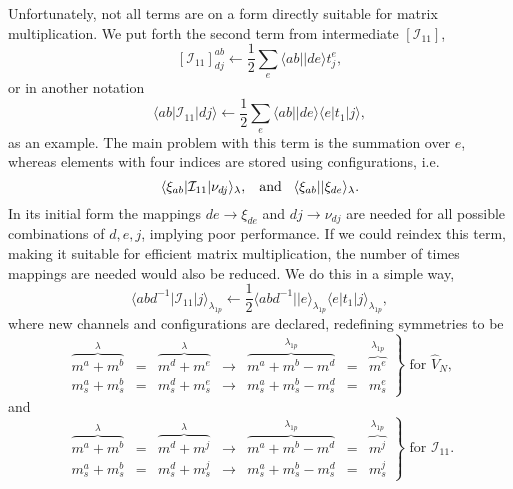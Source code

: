 Unfortunately, not all terms are on a form directly suitable for matrix multiplication.
We put forth the second term from intermediate $\left[\mathcal{I}_{11}\right]$,
\begin{equation}
\left[\mathcal{I}_{11}\right]_{dj}^{ab} \leftarrow \frac{1}{2} \sum_{e} \langle ab||de \rangle  t_j^e ,
\end{equation}
or in another notation
\begin{equation}
\label{eq:CC:i11t2}
\langle ab | \mathcal{I}_{11} | dj \rangle \leftarrow \frac{1}{2} \sum_{e} \langle ab||de \rangle \langle e | t_1 | j \rangle ,
\end{equation}
as an example.
The main problem with this term is the summation over $e$, whereas elements with four indices are stored using configurations, i.e.
\begin{equation}
\langle \xi_{ab} | \mathcal{I}_{11} | \nu_{dj} \rangle_{\lambda} ,
\textrm{\hspace{3mm}and\hspace{3mm}}
\langle \xi_{ab}||\xi_{de} \rangle_{\lambda} .
\end{equation}
In its initial form the mappings $de \rightarrow \xi_{de}$ and $dj \rightarrow \nu_{dj}$ are needed for all possible combinations of $d,e,j$, implying poor performance.
If we could reindex this term, making it suitable for efficient matrix multiplication, the number of times mappings are needed would also be reduced.
We do this in a simple way,
\begin{equation}
\langle abd^{-1} | \mathcal{I}_{11} | j \rangle_{\lambda_{1p}} \leftarrow \frac{1}{2}
\langle abd^{-1} || e \rangle_{\lambda_{1p}} \langle e |t_1|j\rangle_{\lambda_{1p}} ,
\end{equation}
where new channels and configurations are declared, redefining symmetries to be 
\begin{equation}
\left.
\begin{array}{ccccccc}
\overbrace{m^a + m^b}^{\lambda} 
&=&
\overbrace{m^d + m^e}^{\lambda} 
& \rightarrow &
\overbrace{m^a + m^b - m^d}^{\lambda_{1p}} 
&=&
\overbrace{m^e}^{\lambda_{1p}} \\
m_s^a + m_s^b 
&=& 
m_s^d + m_s^e 
&\rightarrow & 
m_s^a + m_s^b - m_s^d 
&=&
m_s^e 
\end{array}
\right\rbrace \textrm{ for } \hat{V}_{N}, 
\end{equation}
and
\begin{equation}
\left.
\begin{array}{ccccccc}
\overbrace{m^a + m^b}^{\lambda} 
&=&
\overbrace{m^d + m^j}^{\lambda} 
& \rightarrow &
\overbrace{m^a + m^b - m^d}^{\lambda_{1p}} 
&=&
\overbrace{m^j}^{\lambda_{1p}} \\
m_s^a + m_s^b 
&=& 
m_s^d + m_s^j 
&\rightarrow & 
m_s^a + m_s^b - m_s^d 
&=&
m_s^j 
\end{array}
\right\rbrace \textrm{ for } \mathcal{I}_{11} .
\end{equation}
